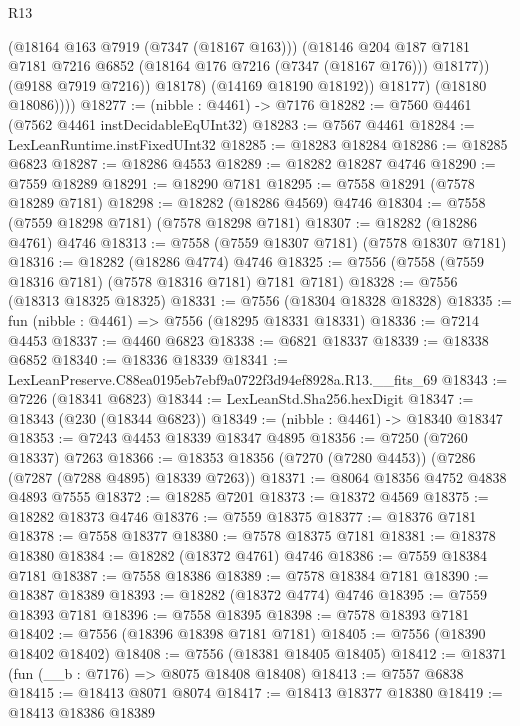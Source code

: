 \begin{lexlean}{R13}
\begin{coremodule}
                    (@18164 @163 @7919 (@7347 (@18167 @163)))
                    (@18146
                      @204
                      @187
                      @7181
                      @7181
                      @7216
                      @6852
                      (@18164 @176 @7216 (@7347 (@18167 @176)))
                      @18177))
                  (@9188 @7919 @7216))
                @18178)
              (@14169 @18190 @18192))
            @18177)
          (@18180 @18086))))
@18277 := (nibble : @4461) -> @7176
@18282 := @7560 @4461 (@7562 @4461 instDecidableEqUInt32)
@18283 := @7567 @4461
@18284 := LexLeanRuntime.instFixedUInt32
@18285 := @18283 @18284
@18286 := @18285 @6823
@18287 := @18286 @4553
@18289 := @18282 @18287 @4746
@18290 := @7559 @18289
@18291 := @18290 @7181
@18295 := @7558 @18291 (@7578 @18289 @7181)
@18298 := @18282 (@18286 @4569) @4746
@18304 := @7558 (@7559 @18298 @7181) (@7578 @18298 @7181)
@18307 := @18282 (@18286 @4761) @4746
@18313 := @7558 (@7559 @18307 @7181) (@7578 @18307 @7181)
@18316 := @18282 (@18286 @4774) @4746
@18325 := @7556 (@7558 (@7559 @18316 @7181) (@7578 @18316 @7181) @7181 @7181)
@18328 := @7556 (@18313 @18325 @18325)
@18331 := @7556 (@18304 @18328 @18328)
@18335 := fun (nibble : @4461) => @7556 (@18295 @18331 @18331)
@18336 := @7214 @4453
@18337 := @4460 @6823
@18338 := @6821 @18337
@18339 := @18338 @6852
@18340 := @18336 @18339
@18341 := LexLeanPreserve.C88ea0195eb7ebf9a0722f3d94ef8928a.R13.__fits_69
@18343 := @7226 (@18341 @6823)
@18344 := LexLeanStd.Sha256.hexDigit
@18347 := @18343 (@230 (@18344 @6823))
@18349 := (nibble : @4461) -> @18340 @18347
@18353 := @7243 @4453 @18339 @18347 @4895
@18356 := @7250 (@7260 @18337) @7263
@18366 := @18353 @18356 (@7270 (@7280 @4453)) (@7286 (@7287 (@7288 @4895) @18339 @7263))
@18371 := @8064 @18356 @4752 @4838 @4893 @7555
@18372 := @18285 @7201
@18373 := @18372 @4569
@18375 := @18282 @18373 @4746
@18376 := @7559 @18375
@18377 := @18376 @7181
@18378 := @7558 @18377
@18380 := @7578 @18375 @7181
@18381 := @18378 @18380
@18384 := @18282 (@18372 @4761) @4746
@18386 := @7559 @18384 @7181
@18387 := @7558 @18386
@18389 := @7578 @18384 @7181
@18390 := @18387 @18389
@18393 := @18282 (@18372 @4774) @4746
@18395 := @7559 @18393 @7181
@18396 := @7558 @18395
@18398 := @7578 @18393 @7181
@18402 := @7556 (@18396 @18398 @7181 @7181)
@18405 := @7556 (@18390 @18402 @18402)
@18408 := @7556 (@18381 @18405 @18405)
@18412 := @18371 (fun (__b : @7176) => @8075 @18408 @18408)
@18413 := @7557 @6838
@18415 := @18413 @8071 @8074
@18417 := @18413 @18377 @18380
@18419 := @18413 @18386 @18389

\end{coremodule}
\end{lexlean}
